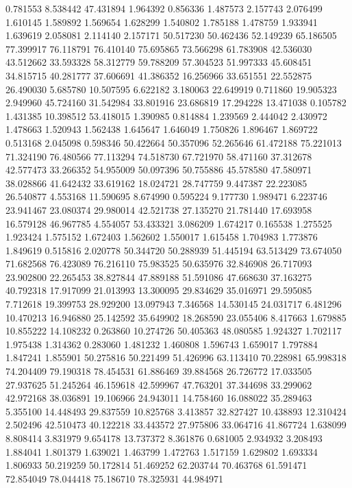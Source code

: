0.781553
8.538442
47.431894
1.964392
0.856336
1.487573
2.157743
2.076499
1.610145
1.589892
1.569654
1.628299
1.540802
1.785188
1.478759
1.933941
1.639619
2.058081
2.114140
2.157171
50.517230
50.462436
52.149239
65.186505
77.399917
76.118791
76.410140
75.695865
73.566298
61.783908
42.536030
43.512662
33.593328
58.312779
59.788209
57.304523
51.997333
45.608451
34.815715
40.281777
37.606691
41.386352
16.256966
33.651551
22.552875
26.490030
5.685780
10.507595
6.622182
3.180063
22.649919
0.711860
19.905323
2.949960
45.724160
31.542984
33.801916
23.686819
17.294228
13.471038
0.105782
1.431385
10.398512
53.418015
1.390985
0.814884
1.239569
2.444042
2.430972
1.478663
1.520943
1.562438
1.645647
1.646049
1.750826
1.896467
1.869722
0.513168
2.045098
0.598346
50.422664
50.357096
52.265646
61.472188
75.221013
71.324190
76.480566
77.113294
74.518730
67.721970
58.471160
37.312678
42.577473
33.266352
54.955009
50.097396
50.755886
45.578580
47.580971
38.028866
41.642432
33.619162
18.024721
28.747759
9.447387
22.223085
26.540877
4.553168
11.590695
8.674990
0.595224
9.177730
1.989471
6.223746
23.941467
23.080374
29.980014
42.521738
27.135270
21.781440
17.693958
16.579128
46.967785
4.554057
53.433321
3.086209
1.674217
0.165538
1.275525
1.923424
1.575152
1.672403
1.562602
1.550017
1.615458
1.704983
1.773876
1.849619
0.515816
2.020778
50.344720
50.288939
51.445194
63.513429
73.674050
71.682568
76.423089
76.216110
75.983525
50.635976
32.846908
26.717093
23.902800
22.265453
38.827844
47.889188
51.591086
47.668630
37.163275
40.792318
17.917099
21.013993
13.300095
29.834629
35.016971
29.595085
7.712618
19.399753
28.929200
13.097943
7.346568
14.530145
24.031717
6.481296
10.470213
16.946880
25.142592
35.649902
18.268590
23.055406
8.417663
1.679885
10.855222
14.108232
0.263860
10.274726
50.405363
48.080585
1.924327
1.702117
1.975438
1.314362
0.283060
1.481232
1.460808
1.596743
1.659017
1.797884
1.847241
1.855901
50.275816
50.221499
51.426996
63.113410
70.228981
65.998318
74.204409
79.190318
78.454531
61.886469
39.884568
26.726772
17.033505
27.937625
51.245264
46.159618
42.599967
47.763201
37.344698
33.299062
42.972168
38.036891
19.106966
24.943011
14.758460
16.088022
35.289463
5.355100
14.448493
29.837559
10.825768
3.413857
32.827427
10.438893
12.310424
2.502496
42.510473
40.122218
33.443572
27.975806
33.064716
41.867724
1.638099
8.808414
3.831979
9.654178
13.737372
8.361876
0.681005
2.934932
3.208493
1.884041
1.801379
1.639021
1.463799
1.472763
1.517159
1.629802
1.693334
1.806933
50.219259
50.172814
51.469252
62.203744
70.463768
61.591471
72.854049
78.044418
75.186710
78.325931
44.984971
